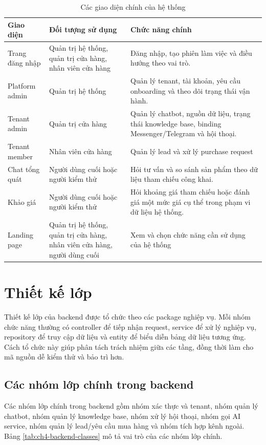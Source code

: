 \documentclass[../DoAn.tex]{subfiles}
\begin{document}
\begin{table}[H]
\centering
\caption{Các giao diện chính của hệ thống}
\label{tab:ch4-ui-main}
\begin{tabular}{|p{}|p{}|p{}|}
\hline
\textbf{Giao diện} & \textbf{Đối tượng sử dụng} & \textbf{Chức năng chính} \\
\hline
Trang đăng nhập & Quản trị hệ thống, quản trị cửa hàng, nhân viên cửa hàng & Đăng nhập, tạo phiên làm việc và điều hướng theo vai trò. \\
\hline
Platform admin & Quản trị hệ thống & Quản lý tenant, tài khoản, yêu cầu onboarding và theo dõi trạng thái vận hành. \\
\hline
Tenant admin & Quản trị cửa hàng & Quản lý chatbot, nguồn dữ liệu, trạng thái knowledge base, binding Messenger/Telegram và hội thoại. \\
\hline
Tenant member & Nhân viên cửa hàng & Quản lý lead và xử lý purchase request \\
\hline
Chat tổng quát & Người dùng cuối hoặc người kiểm thử & Hỏi tư vấn và so sánh sản phẩm theo dữ liệu tham chiếu công khai. \\
\hline
Khảo giá & Người dùng cuối hoặc người kiểm thử & Hỏi khoảng giá tham chiếu hoặc đánh giá một mức giá cụ thể trong phạm vi dữ liệu hệ thống. \\
\hline
Landing page & Quản trị hệ thống, quản trị cửa hàng, nhân viên cửa hàng, người dùng cuối & Xem và chọn chức năng cần sử dụng của hệ thống \\
\hline
\end{tabular}
\end{table}

\section{Thiết kế lớp}

Thiết kế lớp của backend được tổ chức theo các package nghiệp vụ. Mỗi nhóm chức năng thường có controller để tiếp nhận request, service để xử lý nghiệp vụ, repository để truy cập dữ liệu và entity để biểu diễn bảng dữ liệu tương ứng. Cách tổ chức này giúp phân tách trách nhiệm giữa các tầng, đồng thời làm cho mã nguồn dễ kiểm thử và bảo trì hơn.

\subsection{Các nhóm lớp chính trong backend}

Các nhóm lớp chính trong backend gồm nhóm xác thực và tenant, nhóm quản lý chatbot, nhóm quản lý knowledge base, nhóm xử lý hội thoại, nhóm gọi AI service, nhóm quản lý lead/yêu cầu mua hàng và nhóm tích hợp kênh ngoài. Bảng \ref{tab:ch4-backend-classes} mô tả vai trò của các nhóm lớp chính.
\end{document}
